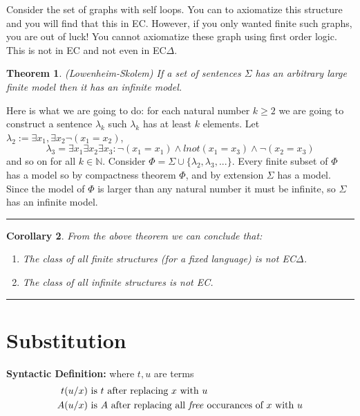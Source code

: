 \documentclass[twoside]{article}
\newcounter{lecnum}
\newtheorem{theorem}{Theorem}[lecnum]
\newtheorem{corollary}[theorem]{Corollary}
\newenvironment{proof}{{\bf Proof:}}{\hfill\rule{2mm}{2mm}}
\def\N{\mathbb{N}}
\begin{document}
Consider the set of graphs with self loops. You can to axiomatize this structure and you will find that this in EC. However, if you only wanted finite such graphs, you are out of luck! You cannot axiomatize these graph using first order logic. This is not in EC and not even in EC$\Delta$.

\begin{theorem}
(Lowenheim-Skolem) If a set of sentences $\Sigma$ has an arbitrary large finite model then it has an infinite model.
\end{theorem}
\begin{proof}
Here is what we are going to do: for each natural number $k \geq 2$ we are going to construct a sentence $\lambda_k$ such $\lambda_k$ has at least $k$ elements. Let $\lambda_2 := \exists x_1, \exists x_2 \lnot (x_1 = x_2)$, 
\[\lambda_3 = \exists x_1\exists x_2\exists x_3: \lnot (x_1 = x_1) \land lnot (x_1 = x_3) \land \lnot (x_2 = x_3) \]
and so on for all $k \in \N$. Consider $\Phi = \Sigma \cup \{\lambda_2, \lambda_3, ... \}$. Every finite subset of $\Phi$ has a model so by compactness theorem $\Phi$, and by extension $\Sigma$ has a model. Since the model of $\Phi$ is larger than any natural number it must be infinite, so $\Sigma$ has an infinite model.
\end{proof}

\begin{corollary}
From the above theorem we can conclude that:
\begin{enumerate}
\item The class of all finite structures (for a fixed language) is not EC$\Delta$.
\item The class of all infinite structures is not EC.
\end{enumerate}
\end{corollary}
\begin{proof}

\end{proof}

\section{Substitution}
\textbf{Syntactic Definition:} where $t, u$ are terms
\begin{align*}
t(u/x) &\mbox{ is } t \mbox{ after replacing } x \mbox{ with } u \\
A(u/x) &\mbox{ is } A \mbox{ after replacing all \emph{free} occurances of } x \mbox{ with } u \\
\end{align*}
\end{document}
